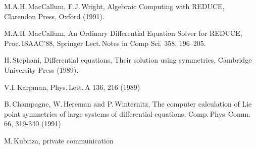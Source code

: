 \begin{thebibliography}{99}
 M.A.H.\,MacCallum, F.J.\,Wright, Algebraic Computing with REDUCE,
Clarendon Press, Oxford (1991).

 M.A.H.\,MacCallum, An Ordinary Differential Equation
Solver for REDUCE, Proc.\,ISAAC'88, Springer Lect.\,Notes in Comp Sci.
358, 196--205.

 H.\,Stephani, Differential equations, Their solution using
symmetries, Cambridge University Press (1989).

 V.I.\,Karpman, Phys.\,Lett.\,A 136, 216 (1989)

 B.\,Champagne, W.\,Hereman and P.\,Winternitz, The computer
      calculation of Lie point symmetries of large systems of differential
      equations, Comp.\,Phys.\,Comm.\,66, 319-340 (1991)

 M.\,Kubitza, private communication

\end{thebibliography}





